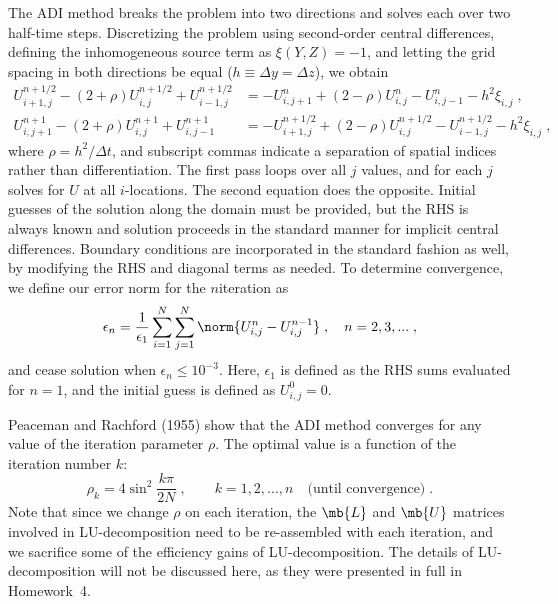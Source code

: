 \documentclass[11pt]{article}
\begin{document}
The ADI method breaks the problem into two directions and solves each over two half-time steps. Discretizing the problem using second-order central differences, defining the inhomogeneous source term as $\xi(Y,Z) = -1$, and letting the grid spacing in both directions be equal ($h \equiv \Delta y = \Delta z$), we obtain
\begin{align}
U_{i+1,j}^{n+1/2} - (2 + \rho) U_{i,j}^{n+1/2} + U_{i-1,j}^{n+1/2}
&=
-U_{i,j+1}^{n} + (2 - \rho) U_{i,j}^{n} - U_{i,j-1}^{n} - h^2 \xi_{i,j}
\;, \\
U_{i,j+1}^{n+1} - (2 + \rho) U_{i,j}^{n+1} + U_{i,j-1}^{n+1}
&=
-U_{i+1,j}^{n+1/2} + (2 - \rho) U_{i,j}^{n+1/2} - U_{i-1,j}^{n+1/2} - h^2 \xi_{i,j}
\;,
\end{align}
where $\rho = h^2 / \Delta t$, and subscript commas indicate a separation of spatial indices rather than differentiation. The first pass loops over all $j$ values, and for each $j$ solves for $U$ at all $i$-locations. The second equation does the opposite. Initial guesses of the solution along the domain must be provided, but the RHS is always known and solution proceeds in the standard manner for implicit central differences. Boundary conditions are incorporated in the standard fashion as well, by modifying the RHS and diagonal terms as needed. To determine convergence, we define our error norm for the $n$\th iteration as
\begin{equation}
\epsilon_n = \frac{1}{\epsilon_1} \sum_{i=1}^N \sum_{j=1}^N \norm{U_{i,j}^{n} - U_{i,j}^{n-1}}
\;, \quad
n = 2, 3, ...
\;,
\end{equation}
and cease solution when $\epsilon_n \le 10^{-3}$. Here, $\epsilon_1$ is defined as the RHS sums evaluated for $n=1$, and the initial guess is defined as $U_{i,j}^0 = 0$.

Peaceman and Rachford (1955) show that the ADI method converges for any value of the iteration parameter $\rho$. The optimal value is a function of the iteration number $k$:
\begin{equation}
\rho_k = 4 \sin^2 \frac{k \pi}{2 N}
\;, \qquad
k = 1, 2, ..., n \quad \text{(until convergence)}
\;.
\end{equation}
Note that since we change $\rho$ on each iteration, the $\mb{L}$ and $\mb{U}$ matrices involved in LU-decomposition need to be re-assembled with each iteration, and we sacrifice some of the efficiency gains of LU-decomposition. The details of LU-decomposition will not be discussed here, as they were presented in full in Homework~4.
\end{document}
